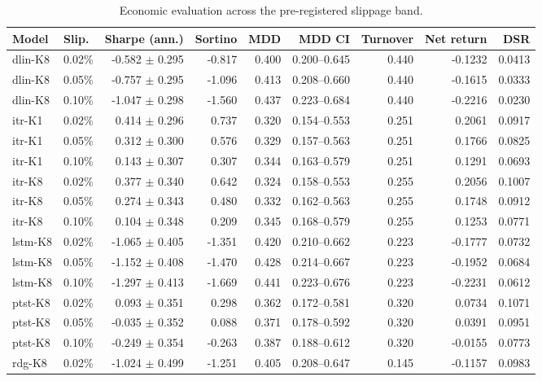\begin{table}[!t]
\centering
\caption{Economic evaluation across the pre-registered slippage band.}
\label{tab:economics}
\begin{tabular}{llrrrrrrr}
\toprule
Model & Slip. & Sharpe (ann.) & Sortino & MDD & MDD CI & Turnover & Net return & DSR \\
\midrule
dlin-K8 & 0.02\% & -0.582 $\pm$ 0.295 & -0.817 & 0.400 & 0.200--0.645 & 0.440 & -0.1232 & 0.0413 \\
dlin-K8 & 0.05\% & -0.757 $\pm$ 0.295 & -1.096 & 0.413 & 0.208--0.660 & 0.440 & -0.1615 & 0.0333 \\
dlin-K8 & 0.10\% & -1.047 $\pm$ 0.298 & -1.560 & 0.437 & 0.223--0.684 & 0.440 & -0.2216 & 0.0230 \\
itr-K1 & 0.02\% & 0.414 $\pm$ 0.296 & 0.737 & 0.320 & 0.154--0.553 & 0.251 & 0.2061 & 0.0917 \\
itr-K1 & 0.05\% & 0.312 $\pm$ 0.300 & 0.576 & 0.329 & 0.157--0.563 & 0.251 & 0.1766 & 0.0825 \\
itr-K1 & 0.10\% & 0.143 $\pm$ 0.307 & 0.307 & 0.344 & 0.163--0.579 & 0.251 & 0.1291 & 0.0693 \\
itr-K8 & 0.02\% & 0.377 $\pm$ 0.340 & 0.642 & 0.324 & 0.158--0.553 & 0.255 & 0.2056 & 0.1007 \\
itr-K8 & 0.05\% & 0.274 $\pm$ 0.343 & 0.480 & 0.332 & 0.162--0.563 & 0.255 & 0.1748 & 0.0912 \\
itr-K8 & 0.10\% & 0.104 $\pm$ 0.348 & 0.209 & 0.345 & 0.168--0.579 & 0.255 & 0.1253 & 0.0771 \\
lstm-K8 & 0.02\% & -1.065 $\pm$ 0.405 & -1.351 & 0.420 & 0.210--0.662 & 0.223 & -0.1777 & 0.0732 \\
lstm-K8 & 0.05\% & -1.152 $\pm$ 0.408 & -1.470 & 0.428 & 0.214--0.667 & 0.223 & -0.1952 & 0.0684 \\
lstm-K8 & 0.10\% & -1.297 $\pm$ 0.413 & -1.669 & 0.441 & 0.223--0.676 & 0.223 & -0.2231 & 0.0612 \\
ptst-K8 & 0.02\% & 0.093 $\pm$ 0.351 & 0.298 & 0.362 & 0.172--0.581 & 0.320 & 0.0734 & 0.1071 \\
ptst-K8 & 0.05\% & -0.035 $\pm$ 0.352 & 0.088 & 0.371 & 0.178--0.592 & 0.320 & 0.0391 & 0.0951 \\
ptst-K8 & 0.10\% & -0.249 $\pm$ 0.354 & -0.263 & 0.387 & 0.188--0.612 & 0.320 & -0.0155 & 0.0773 \\
rdg-K8 & 0.02\% & -1.024 $\pm$ 0.499 & -1.251 & 0.405 & 0.208--0.647 & 0.145 & -0.1157 & 0.0983 \\

\end{tabular}
\end{table}
